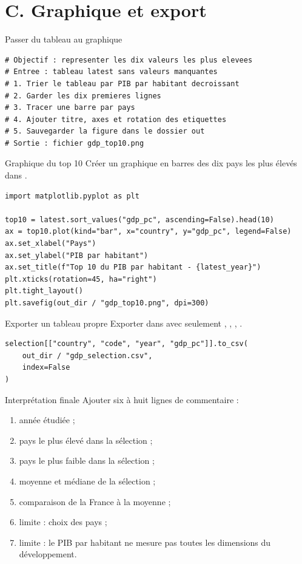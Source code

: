 \documentclass[11pt,a4paper]{article}
\begin{document}
\section*{C. Graphique et export}

\begin{pseudocodeexercise}{Passer du tableau au graphique}
\begin{lstlisting}
# Objectif : representer les dix valeurs les plus elevees
# Entree : tableau latest sans valeurs manquantes
# 1. Trier le tableau par PIB par habitant decroissant
# 2. Garder les dix premieres lignes
# 3. Tracer une barre par pays
# 4. Ajouter titre, axes et rotation des etiquettes
# 5. Sauvegarder la figure dans le dossier out
# Sortie : fichier gdp_top10.png
\end{lstlisting}
\end{pseudocodeexercise}

\begin{mandatoryexercise}{Graphique du top 10}
Créer un graphique en barres des dix pays les plus élevés dans .
\begin{lstlisting}
import matplotlib.pyplot as plt

top10 = latest.sort_values("gdp_pc", ascending=False).head(10)
ax = top10.plot(kind="bar", x="country", y="gdp_pc", legend=False)
ax.set_xlabel("Pays")
ax.set_ylabel("PIB par habitant")
ax.set_title(f"Top 10 du PIB par habitant - {latest_year}")
plt.xticks(rotation=45, ha="right")
plt.tight_layout()
plt.savefig(out_dir / "gdp_top10.png", dpi=300)
\end{lstlisting}
\end{mandatoryexercise}

\begin{mandatoryexercise}{Exporter un tableau propre}
Exporter  dans  avec seulement , , , .
\begin{lstlisting}
selection[["country", "code", "year", "gdp_pc"]].to_csv(
    out_dir / "gdp_selection.csv",
    index=False
)
\end{lstlisting}
\end{mandatoryexercise}

\begin{mandatoryexercise}{Interprétation finale}
Ajouter six à huit lignes de commentaire :
\begin{enumerate}
  \item année étudiée ;
  \item pays le plus élevé dans la sélection ;
  \item pays le plus faible dans la sélection ;
  \item moyenne et médiane de la sélection ;
  \item comparaison de la France à la moyenne ;
  \item limite : choix des pays ;
  \item limite : le PIB par habitant ne mesure pas toutes les dimensions du développement.
\end{enumerate}
\end{mandatoryexercise}
\end{document}

